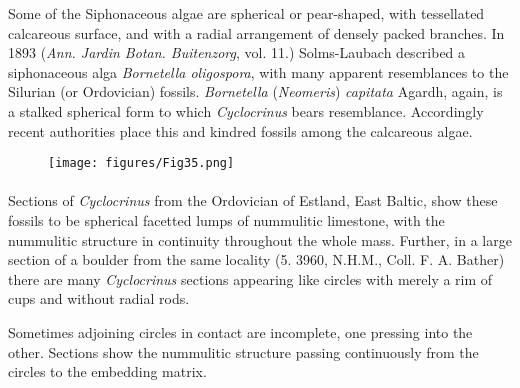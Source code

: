 \documentclass[a4paper, 12pt, oneside]{article}
\begin{document}
Some of the Siphonaceous algae are spherical or pear-shaped, with tessellated calcareous surface, and with a radial arrangement of densely packed branches. In 1893 (\emph{Ann. Jardin Botan. Buitenzorg}, vol. 11.) Solms-Laubach described a siphonaceous alga \emph{Bornetella oligospora}, with many apparent resemblances to the Silurian (or Ordovician) fossils. \emph{Bornetella} (\emph{Neomeris}) \emph{capitata} Agardh, again, is a stalked spherical form to which \emph{Cyclocrinus} bears resemblance. Accordingly recent authorities place this and kindred fossils among the calcareous algae.
\begin{figure}[H]
\centering
\texttt{[image: figures/Fig35.png]}
\caption*{}
\end{figure}
\paragraph{}
Sections of \emph{Cyclocrinus} from the Ordovician of Estland, East Baltic, show these fossils to be spherical facetted lumps of nummulitic limestone, with the nummulitic structure in continuity throughout the whole mass. Further, in a large section of a boulder from the same locality (5. 3960, N.H.M., Coll. F. A. Bather) there are many \emph{Cyclocrinus} sections appearing like circles with merely a rim of cups and without radial rods.

Sometimes adjoining circles in contact are incomplete, one pressing into the other. Sections show the nummulitic structure passing continuously from the circles to the embedding matrix.
\end{document}
